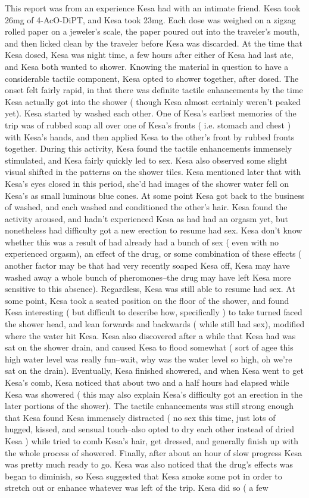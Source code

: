 \documentclass[12pt]{book}
\begin{document}
This report was from an experience Kesa had with an intimate friend. Kesa took 26mg of 4-AcO-DiPT, and Kesa took 23mg. Each dose was weighed on a zigzag rolled paper on a jeweler's scale, the paper poured out into the traveler's mouth, and then licked clean by the traveler before Kesa was discarded. At the time that Kesa dosed, Kesa was night time, a few hours after either of Kesa had last ate, and Kesa both wanted to shower. Knowing the material in question to have a considerable tactile component, Kesa opted to shower together, after dosed. The onset felt fairly rapid, in that there was definite tactile enhancements by the time Kesa actually got into the shower ( though Kesa almost certainly weren't peaked yet). Kesa started by washed each other. One of Kesa's earliest memories of the trip was of rubbed soap all over one of Kesa's fronts ( i.e. stomach and chest ) with Kesa's hands, and then applied Kesa to the other's front by rubbed fronts together. During this activity, Kesa found the tactile enhancements immensely stimulated, and Kesa fairly quickly led to sex. Kesa also observed some slight visual shifted in the patterns on the shower tiles. Kesa mentioned later that with Kesa's eyes closed in this period, she'd had images of the shower water fell on Kesa's as small luminous blue cones. At some point Kesa got back to the business of washed, and each washed and conditioned the other's hair. Kesa found the activity aroused, and hadn't experienced Kesa as had had an orgasm yet, but nonetheless had difficulty got a new erection to resume had sex. Kesa don't know whether this was a result of had already had a bunch of sex ( even with no experienced orgasm), an effect of the drug, or some combination of these effects ( another factor may be that had very recently soaped Kesa off, Kesa may have washed away a whole bunch of pheromones--the drug may have left Kesa more sensitive to this absence). Regardless, Kesa was still able to resume had sex. At some point, Kesa took a seated position on the floor of the shower, and found Kesa interesting ( but difficult to describe how, specifically ) to take turned faced the shower head, and lean forwards and backwards ( while still had sex), modified where the water hit Kesa. Kesa also discovered after a while that Kesa had was sat on the shower drain, and caused Kesa to flood somewhat ( sort of agee this high water level was really fun--wait, why was the water level so high, oh we're sat on the drain). Eventually, Kesa finished showered, and when Kesa went to get Kesa's comb, Kesa noticed that about two and a half hours had elapsed while Kesa was showered ( this may also explain Kesa's difficulty got an erection in the later portions of the shower). The tactile enhancements was still strong enough that Kesa found Kesa immensely distracted ( no sex this time, just lots of hugged, kissed, and sensual touch--also opted to dry each other instead of dried Kesa ) while tried to comb Kesa's hair, get dressed, and generally finish up with the whole process of showered. Finally, after about an hour of slow progress Kesa was pretty much ready to go. Kesa was also noticed that the drug's effects was began to diminish, so Kesa suggested that Kesa smoke some pot in order to stretch out or enhance whatever was left of the trip. Kesa did so ( a few 
\end{document}
